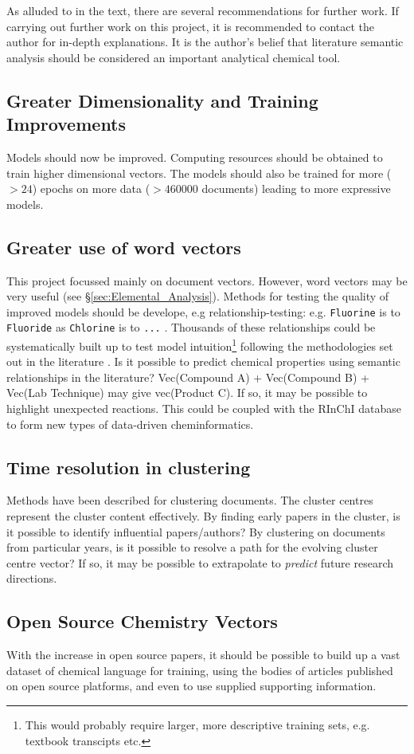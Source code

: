 \label{chapt:RECOMMENDATIONS}
As alluded to in the text, there are several recommendations for further work. If carrying out further work on this project, it is recommended to contact the author for in-depth explanations. It is the author's belief that literature semantic analysis should be considered an important analytical chemical tool.
\subsection{Greater Dimensionality and Training Improvements}
Models should now be improved. Computing resources should be obtained to train higher dimensional vectors. The models should also be trained for more ($> 24$) epochs on more data ($> 460000$ documents) leading to more expressive models.
\subsection{Greater use of word vectors}
\label{sec:recomm_word_vectors}
This project focussed mainly on document vectors. However, word vectors may be very useful (see \S\ref{sec:Elemental_Analysis}). Methods for testing the quality of improved models should be develope, e.g  relationship-testing: e.g. \texttt{Fluorine} is to \texttt{Fluoride} as \texttt{Chlorine} is to \texttt{...} . Thousands of these relationships could be systematically built up to test model intuition\footnote{This would probably require larger, more descriptive training sets, e.g. textbook transcipts etc.} following the methodologies set out in the literature \cite{word2vec1}\cite{word2vec2}. Is it possible to predict chemical properties using semantic relationships in the literature? Vec(Compound A) + Vec(Compound B) + Vec(Lab Technique) may give vec(Product C). If so, it may be possible to highlight unexpected reactions. This could be coupled with the RInChI database to form new types of data-driven cheminformatics.
\subsection{Time resolution in clustering}
Methods have been described for clustering documents. The cluster centres represent the cluster content effectively. By finding early papers in the cluster, is it possible to identify influential papers/authors?
By clustering on documents from particular years, is it possible to resolve a path for the evolving cluster centre vector? If so, it may be possible to extrapolate to \emph{predict} future research directions.
\subsection{Open Source Chemistry Vectors}
With the increase in open source papers, it should be possible to build up a vast dataset of chemical language for training, using the bodies of articles published on open source platforms, and even to use supplied supporting information. 
